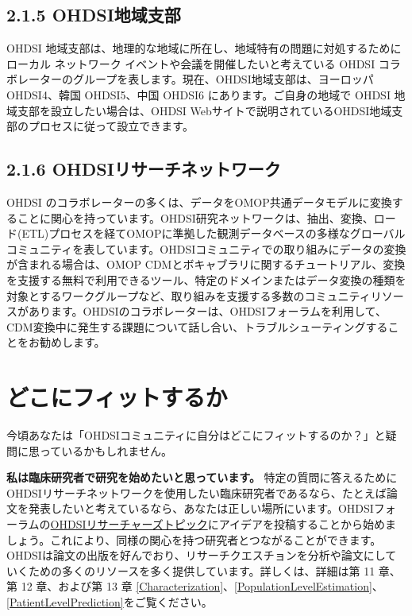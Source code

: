 \documentclass[
  11pt]{book}
\theoremstyle{definition}
\theoremstyle{definition}
\theoremstyle{definition}
\theoremstyle{definition}
\theoremstyle{remark}
\begin{document}
\subsection{2.1.5 OHDSI地域支部}\label{ohdsiux5730ux57dfux652fux90e8}

OHDSI 地域支部は、地理的な地域に所在し、地域特有の問題に対処するためにローカル ネットワーク イベントや会議を開催したいと考えている OHDSI コラボレーターのグループを表します。現在、OHDSI地域支部は、ヨーロッパ OHDSI4、韓国 OHDSI5、中国 OHDSI6 にあります。ご自身の地域で OHDSI 地域支部を設立したい場合は、OHDSI Webサイトで説明されているOHDSI地域支部のプロセスに従って設立できます。

\subsection{2.1.6 OHDSIリサーチネットワーク}\label{ohdsiux30eaux30b5ux30fcux30c1ux30cdux30c3ux30c8ux30efux30fcux30af}

OHDSI のコラボレーターの多くは、データをOMOP共通データモデルに変換することに関心を持っています。OHDSI研究ネットワークは、抽出、変換、ロード(ETL)プロセスを経てOMOPに準拠した観測データベースの多様なグローバルコミュニティを表しています。OHDSIコミュニティでの取り組みにデータの変換が含まれる場合は、OMOP CDMとボキャブラリに関するチュートリアル、変換を支援する無料で利用できるツール、特定のドメインまたはデータ変換の種類を対象とするワークグループなど、取り組みを支援する多数のコミュニティリソースがあります。OHDSIのコラボレーターは、OHDSIフォーラムを利用して、CDM変換中に発生する課題について話し合い、トラブルシューティングすることをお勧めします。

\section{どこにフィットするか}\label{ux3069ux3053ux306bux30d5ux30a3ux30c3ux30c8ux3059ux308bux304b}

今頃あなたは「OHDSIコミュニティに自分はどこにフィットするのか？」と疑問に思っているかもしれません。

\textbf{私は臨床研究者で研究を始めたいと思っています。} 特定の質問に答えるためにOHDSIリサーチネットワークを使用したい臨床研究者であるなら、たとえば論文を発表したいと考えているなら、あなたは正しい場所にいます。OHDSIフォーラムの\href{https://forums.ohdsi.org/c/researchers}{OHDSIリサーチャーズトピック}にアイデアを投稿することから始めましょう。これにより、同様の関心を持つ研究者とつながることができます。OHDSIは論文の出版を好んでおり、リサーチクエスチョンを分析や論文にしていくための多くのリソースを多く提供しています。詳しくは、詳細は第 11 章、第 12 章、および第 13 章 \ref{Characterization}、\ref{PopulationLevelEstimation}、\ref{PatientLevelPrediction}をご覧ください。
\end{document}
